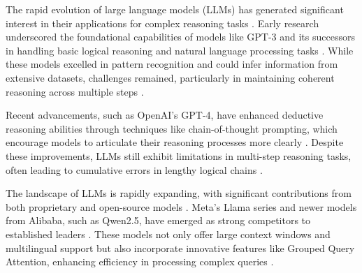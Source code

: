 \documentclass[conference]{IEEEtran}
\begin{document}

%
%
%
The rapid evolution of large language models (LLMs) has generated significant interest in their applications for complex reasoning tasks \cite{chen2024large, hadi2024large}. Early research underscored the foundational capabilities of models like GPT-3 and its successors in handling basic logical reasoning and natural language processing tasks \cite{zhang2021commentary, kalyan2023survey}. While these models excelled in pattern recognition and could infer information from extensive datasets, challenges remained, particularly in maintaining coherent reasoning across multiple steps \cite{yang2024harnessing}.

Recent advancements, such as OpenAI's GPT-4, have enhanced deductive reasoning abilities through techniques like chain-of-thought prompting, which encourage models to articulate their reasoning processes more clearly \cite{gou2024rationality}. Despite these improvements, LLMs still exhibit limitations in multi-step reasoning tasks, often leading to cumulative errors in lengthy logical chains \cite{tong2024can}.

The landscape of LLMs is rapidly expanding, with significant contributions from both proprietary and open-source models \cite{he2023survey}. Meta's Llama series and newer models from Alibaba, such as Qwen2.5, have emerged as strong competitors to established leaders \cite{hui2024qwen2, yang2024qwen2}. These models not only offer large context windows and multilingual support but also incorporate innovative features like Grouped Query Attention, enhancing efficiency in processing complex queries \cite{yang2024harnessing}.
\end{document}
